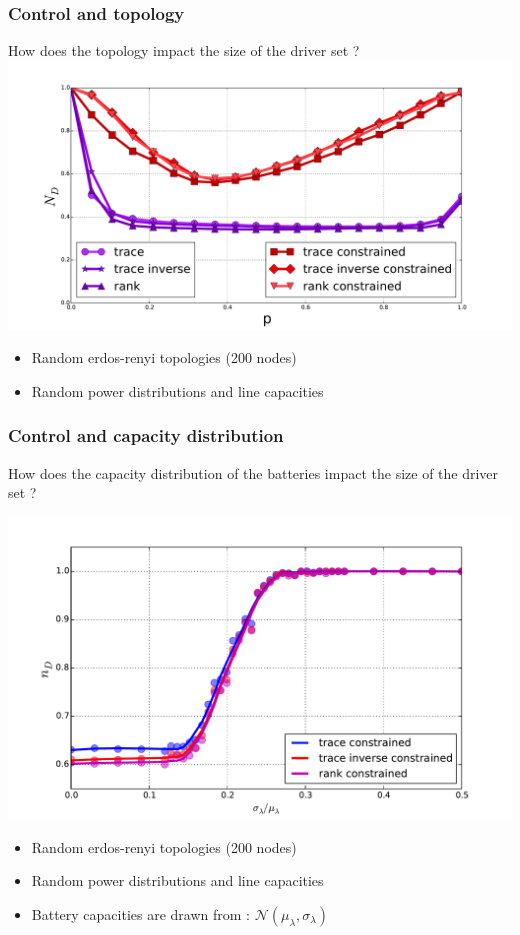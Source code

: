 \documentclass[xcolor=dvipsnames]{beamer}
\begin{document}
\begin{frame}
	\frametitle{Control and topology}
	
	How does the topology impact the size of the driver set ?	
	\includegraphics[scale=.3]{figure_4}
	\begin{itemize}
		\item Random erdos-renyi topologies (200 nodes)
		\item Random power distributions and line capacities
	\end{itemize}
\end{frame}

\begin{frame}
	\frametitle{Control and capacity distribution}
	
	How does the capacity distribution of the batteries impact the size of the driver set ?
	
	\includegraphics[scale=.3]{figure_7}
	\begin{itemize}
		\item Random erdos-renyi topologies (200 nodes)
		\item Random power distributions and line capacities
		\item Battery capacities are drawn from : $\mathcal{N}(\mu_{\lambda}, \sigma_{\lambda})$
	\end{itemize}
\end{frame}
\end{document}
